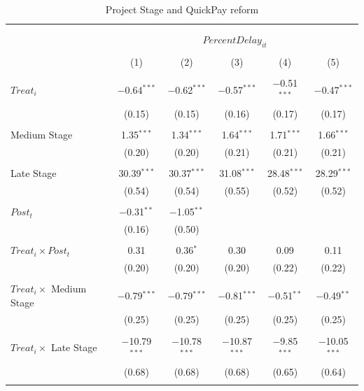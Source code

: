 \documentclass[
]{article}
\begin{document}
\begin{table}[H] \centering 
  \caption{Project Stage and QuickPay reform} 
  \label{} 
\small 
\begin{tabular}{@{\extracolsep{-2pt}}lccccc} 
\\[-1.8ex]\hline 
\hline \\[-1.8ex] 
\\[-1.8ex] & \multicolumn{5}{c}{$PercentDelay_{it}$  } \\ 
\\[-1.8ex] & (1) & (2) & (3) & (4) & (5)\\ 
\hline \\[-1.8ex] 
 $Treat_i$ & $-$0.64$^{***}$ & $-$0.62$^{***}$ & $-$0.57$^{***}$ & $-$0.51$^{***}$ & $-$0.47$^{***}$ \\ 
  & (0.15) & (0.15) & (0.16) & (0.17) & (0.17) \\ 
  & & & & & \\ 
 Medium Stage & 1.35$^{***}$ & 1.34$^{***}$ & 1.64$^{***}$ & 1.71$^{***}$ & 1.66$^{***}$ \\ 
  & (0.20) & (0.20) & (0.21) & (0.21) & (0.21) \\ 
  & & & & & \\ 
 Late Stage & 30.39$^{***}$ & 30.37$^{***}$ & 31.08$^{***}$ & 28.48$^{***}$ & 28.29$^{***}$ \\ 
  & (0.54) & (0.54) & (0.55) & (0.52) & (0.52) \\ 
  & & & & & \\ 
 $Post_t$ & $-$0.31$^{**}$ & $-$1.05$^{**}$ &  &  &  \\ 
  & (0.16) & (0.50) &  &  &  \\ 
  & & & & & \\ 
 $Treat_i \times Post_t$ & 0.31 & 0.36$^{*}$ & 0.30 & 0.09 & 0.11 \\ 
  & (0.20) & (0.20) & (0.20) & (0.22) & (0.22) \\ 
  & & & & & \\ 
 $Treat_i \times$ Medium Stage & $-$0.79$^{***}$ & $-$0.79$^{***}$ & $-$0.81$^{***}$ & $-$0.51$^{**}$ & $-$0.49$^{**}$ \\ 
  & (0.25) & (0.25) & (0.25) & (0.25) & (0.25) \\ 
  & & & & & \\ 
 $Treat_i \times$ Late Stage & $-$10.79$^{***}$ & $-$10.78$^{***}$ & $-$10.87$^{***}$ & $-$9.85$^{***}$ & $-$10.05$^{***}$ \\ 
  & (0.68) & (0.68) & (0.68) & (0.65) & (0.64) \\ 
  & & & & & \\ 

\end{tabular}
\end{table}
\end{document}
